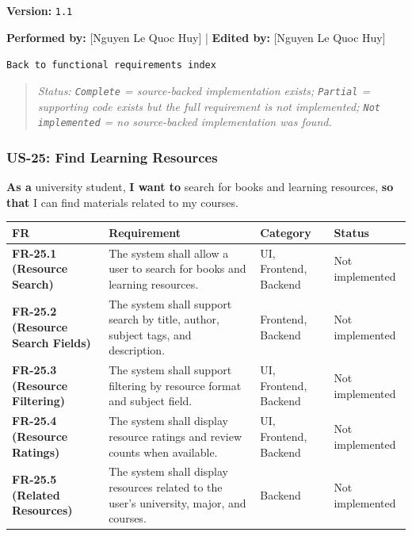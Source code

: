 \documentclass[12pt]{article}
\renewcommand{\baselinestretch}{1.5}
\begin{document}
\textbf{Version:} \texttt{1.1}
\par\medskip

\textbf{Performed by:} [Nguyen Le Quoc Huy] | \textbf{Edited by:} [Nguyen Le Quoc Huy]
\par\medskip

\texttt{Back to functional requirements index}
\par\medskip

\begin{quote}
\textit{Status: \texttt{Complete} = source-backed implementation exists; \texttt{Partial} = supporting code exists but the full requirement is not implemented; \texttt{Not implemented} = no source-backed implementation was found.}
\end{quote}
\par\medskip

\hypertarget{sec:us-25-find-learning-resources}{}
\subsubsection*{US-25: Find Learning Resources}
\par\medskip

\textbf{As a} university student, \textbf{I want to} search for books and learning resources, \textbf{so that} I can find materials related to my courses.
\par\medskip

\begingroup
\small
\renewcommand{\baselinestretch}{1.0}\selectfont
\renewcommand{\arraystretch}{1.15}
\setlength{\tabcolsep}{6pt}
\begin{longtable}{|>{\raggedright\arraybackslash}p{}|>{\raggedright\arraybackslash}p{}|>{\raggedright\arraybackslash}p{}|>{\raggedright\arraybackslash}p{}|}
\hline
\textbf{FR} & \textbf{Requirement} & \textbf{Category} & \textbf{Status} \\ \hline
\endhead
\textbf{FR-25.1 (Resource Search)} & The system shall allow a user to search for books and learning resources. & UI, Frontend, Backend & Not implemented \\ \hline
\textbf{FR-25.2 (Resource Search Fields)} & The system shall support search by title, author, subject tags, and description. & Frontend, Backend & Not implemented \\ \hline
\textbf{FR-25.3 (Resource Filtering)} & The system shall support filtering by resource format and subject field. & UI, Frontend, Backend & Not implemented \\ \hline
\textbf{FR-25.4 (Resource Ratings)} & The system shall display resource ratings and review counts when available. & UI, Frontend, Backend & Not implemented \\ \hline
\textbf{FR-25.5 (Related Resources)} & The system shall display resources related to the user's university, major, and courses. & Backend & Not implemented \\ \hline
\end{longtable}
\endgroup
\par\medskip
\end{document}
